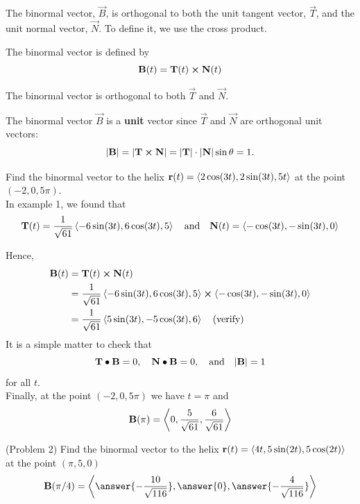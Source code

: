 \documentclass[handout]{ximera}
\begin{document}
The binormal vector, $\vec B$, is orthogonal to both the unit tangent vector, $\vec T$, and the unit normal vector, $\vec N$. To define it, we use the cross product.

\begin{definition}
The binormal vector is defined by
\[
\mathbf B(t) = \mathbf T(t) \boldsymbol\times \mathbf N(t)
\]
\end{definition}

\begin{remark}
The binormal vector is orthogonal to both $\vec T$ and $\vec N$. 
\end{remark}

\begin{remark}
The binormal vector $\vec B$ is a \textbf{unit} vector since $\vec T$ and $\vec N$ are orthogonal unit vectors:
\[
|\mathbf B| = |\mathbf T \boldsymbol\times \mathbf N| = |\mathbf T| \cdot |\mathbf N| \sin \theta = 1.
\]
\end{remark}

\begin{example}[Example 2]
Find the binormal vector to the helix $\mathbf r(t) =  \left\langle 2\cos(3t), 2\sin(3t), 5t\right\rangle$ at the point $(-2, 0, 5\pi)$.\\
In example 1, we found that
\[
\mathbf T(t) = \frac{1}{\sqrt{61}} \left\langle -6 \sin(3t), 6\cos(3t), 5\right\rangle \quad \text{and} \quad \mathbf N(t) = \left\langle -\cos(3t), -\sin(3t), 0\right\rangle
\]

Hence,
\begin{align*}
\mathbf B(t) &= \mathbf T(t) \boldsymbol\times \mathbf N(t)\\
          &= \frac{1}{\sqrt{61}} \left\langle -6 \sin(3t), 6\cos(3t), 5\right\rangle \boldsymbol\times \left\langle -\cos(3t), -\sin(3t), 0\right\rangle\\
          &= \frac{1}{\sqrt{61}} \left\langle 5 \sin(3t), -5 \cos(3t), 6\right\rangle \quad \text{(verify)}
\end{align*}
It is a simple matter to check that 
\[
\mathbf T \bullet \mathbf B = 0, \quad \mathbf N \bullet \mathbf B = 0, \quad \text{and} \quad |\mathbf B| = 1
\]
for all $t$.\\
Finally, at the point $(-2, 0, 5\pi)$ we have $t = \pi$ and
\[
\mathbf B(\pi) = \left\langle 0, \frac{5}{\sqrt {61}}, \frac{6}{\sqrt{61}}\right\rangle
\]
\end{example}

\begin{problem}(Problem 2)
Find the binormal vector to the helix $\mathbf r(t) = \left\langle 4t, 5 \sin(2t),5\cos(2t)\right\rangle$ at the point $(\pi, 5, 0)$\\
\[
\vec B(\pi/4) = \vector{\answer{-\frac{10}{\sqrt{116}}}, \answer{0}, \answer{-\frac{4}{\sqrt{116}}}}
\]


\end{problem}
\end{document}
